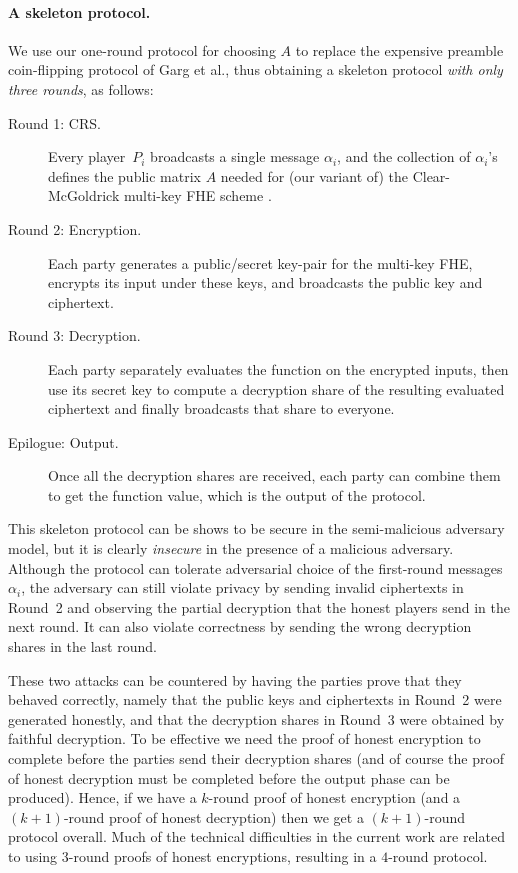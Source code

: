\paragraph{A skeleton protocol.}
We use our one-round protocol for choosing $A$ to replace the expensive preamble coin-flipping protocol of Garg et al., thus obtaining a skeleton protocol \emph{with only three rounds}, as follows:
\begin{description}
\item[Round 1: CRS.] Every player~$P_i$ broadcasts a single message $\alpha_i$, and the collection of $\alpha_i$'s defines the public matrix $A$ needed for (our variant of) the Clear-McGoldrick multi-key FHE scheme \cite{C:CleMcg15,MW16}.

\item[Round 2: Encryption.] Each party generates a public/secret key-pair for the multi-key FHE, encrypts its input under these keys, and broadcasts the public key and ciphertext.

\item[Round 3: Decryption.] Each party separately evaluates the function on the encrypted inputs, then use its secret key to compute a decryption share of the resulting evaluated ciphertext and finally broadcasts that share to everyone.

\item[Epilogue: Output.] Once all the decryption shares are received, each party can combine them to get the function value, which is the output of the protocol.
\end{description}

This skeleton protocol can be shows to be secure in the semi-malicious adversary model, but it is clearly \emph{insecure} in the presence of a malicious adversary.
Although the protocol can tolerate adversarial choice of the first-round messages $\alpha_i$, the adversary can still violate privacy by sending invalid ciphertexts in Round~2 and observing the partial decryption that the honest players send in the next round. It can also violate correctness by sending the wrong decryption shares in the last round.

These two attacks can be countered by having the parties prove that they behaved correctly, namely that the public keys and ciphertexts in Round~2 were generated honestly, and that the decryption shares in Round~3 were obtained by faithful decryption. To be effective we need the proof of honest encryption to complete before the parties send their decryption shares (and of course the proof of honest decryption must be completed before the output phase can be produced). Hence, if we have a $k$-round proof of honest encryption (and a $(k+1)$-round proof of honest decryption) then we get a $(k+1)$-round protocol overall. Much of the technical difficulties in the current work are related to using $3$-round proofs of honest encryptions, resulting in a $4$-round protocol.

